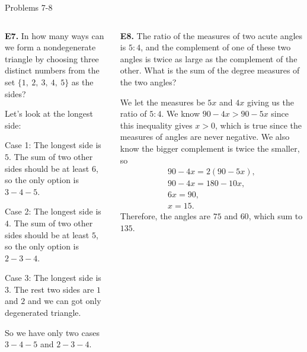 \documentclass[9pt,aspectratio=169]{beamer}
\begin{document}
\begin{frame}{Problems 7-8}
  \begin{columns}[T]
    \begin{column}{0.5\textwidth}
      \begin{problem}
        \textbf{E7.} In how many ways can we form a nondegenerate triangle by choosing three distinct
        numbers from the set $\{1,\ 2,\ 3,\ 4,\ 5\}$ as the sides?
      \end{problem}
      Let's look at the longest side: 

      Case 1: The longest side is $5$. The sum of two other sides should be at least $6$, so the only option is $3-4-5$.

      Case 2: The longest side is $4$. The sum of two other sides should be at least $5$, so the only option is $2-3-4$.

      Case 3: The longest side is $3$. The rest two sides are $1$ and $2$ and we can got only degenerated triangle.

      So we have only two cases $3-4-5$ and $2-3-4$.
    \end{column}
    \begin{column}{0.5\textwidth}
      \begin{problem}
        \textbf{E8.} The ratio of the measures of two acute angles is $5:4$, and the complement of one of these two angles is twice as large as the complement of the other. What is the sum of the degree measures of the two angles?
      \end{problem}
      We let the measures be $5x$ and $4x$ giving us the ratio of $5:4$. We know $90-4x>90-5x$ since this inequality gives $x>0$, which is true since the measures of angles are never negative. We also know the bigger complement is twice the smaller, so
      \begin{gather*}
        90-4x=2(90-5x),\\
        90-4x=180-10x,\\
        6x=90,\\
        x=15.
      \end{gather*}
      Therefore, the angles are $75$ and $60$, which sum to $\boxed{135}$.
    \end{column}
  \end{columns}
\end{frame}
\end{document}
